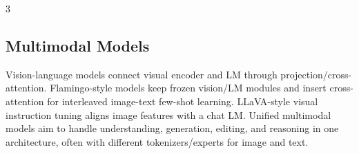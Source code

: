 \documentclass{article}
\begin{document}
\begin{multicols*}{3}
\subsection{Multimodal Models}
Vision-language models connect visual encoder and LM through projection/cross-attention. Flamingo-style models keep frozen vision/LM modules and insert cross-attention for interleaved image-text few-shot learning. LLaVA-style visual instruction tuning aligns image features with a chat LM. Unified multimodal models aim to handle understanding, generation, editing, and reasoning in one architecture, often with different tokenizers/experts for image and text.

\end{multicols*}
\end{document}
